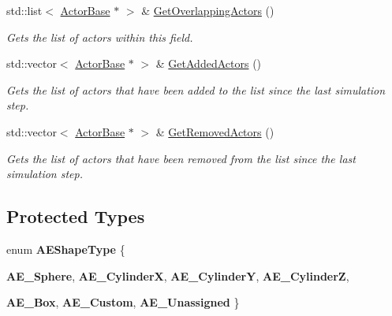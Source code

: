 \begin{DoxyCompactItemize}
std::list$<$ \hyperlink{classphys_1_1ActorBase}{ActorBase} $\ast$ $>$ \& \hyperlink{classphys_1_1AreaEffect_ab995fec11d9e5fbae1851109067958db}{GetOverlappingActors} ()
\begin{DoxyCompactList}\small\item\em Gets the list of actors within this field. \item\end{DoxyCompactList}\item 
std::vector$<$ \hyperlink{classphys_1_1ActorBase}{ActorBase} $\ast$ $>$ \& \hyperlink{classphys_1_1AreaEffect_a72a9673c926ce876df630c4aecfc09f6}{GetAddedActors} ()
\begin{DoxyCompactList}\small\item\em Gets the list of actors that have been added to the list since the last simulation step. \item\end{DoxyCompactList}\item 
std::vector$<$ \hyperlink{classphys_1_1ActorBase}{ActorBase} $\ast$ $>$ \& \hyperlink{classphys_1_1AreaEffect_a021763db69e977a3a19ad7cc39df073b}{GetRemovedActors} ()
\begin{DoxyCompactList}\small\item\em Gets the list of actors that have been removed from the list since the last simulation step. \item\end{DoxyCompactList}\end{DoxyCompactItemize}
\subsection*{Protected Types}
\begin{DoxyCompactItemize}
\item 
enum {\bfseries AEShapeType} \{ \par
{\bfseries AE\_\-Sphere}, 
{\bfseries AE\_\-CylinderX}, 
{\bfseries AE\_\-CylinderY}, 
{\bfseries AE\_\-CylinderZ}, 
\par
{\bfseries AE\_\-Box}, 
{\bfseries AE\_\-Custom}, 
{\bfseries AE\_\-Unassigned}
 \}
\end{DoxyCompactItemize}
